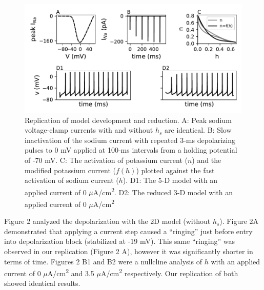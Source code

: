 \begin{figure}
	\centering
	\includegraphics[scale=0.7]{../figures/figure_1.pdf}
	\caption{Replication of model development and reduction. A: Peak sodium voltage-clamp currents with and without $h_{s}$ are identical. B: Slow inactivation of the sodium current with repeated 3-ms depolarizing pulses to 0 mV applied at 100-ms intervals from a holding potential of -70 mV. C: The activation of potassium current ($n$) and the modified potassium current ($f(h)$) plotted against the fast activation of sodium current ($h$). D1: The 5-D model with an applied current of 0 $\mu$A/cm\textsuperscript{2}. D2: The reduced 3-D model with an applied current of 0 $\mu$A/cm\textsuperscript{2}}
	\label{fig:1}
\end{figure}

Figure 2 analyzed the depolarization with the 2D model (without $h_s$). Figure 2A demonstrated that applying a current step caused a “ringing” just before entry into depolarization block (stabilized at -19 mV). This same “ringing” was observed in our replication (Figure 2 A), however it was significantly shorter in terms of time. Figures 2 B1 and B2 were a nullcline analysis of $h$ with an applied current of 0 $\mu$A/cm\textsuperscript{2} and 3.5 $\mu$A/cm\textsuperscript{2} respectively. Our replication of both showed identical results.\\ 

